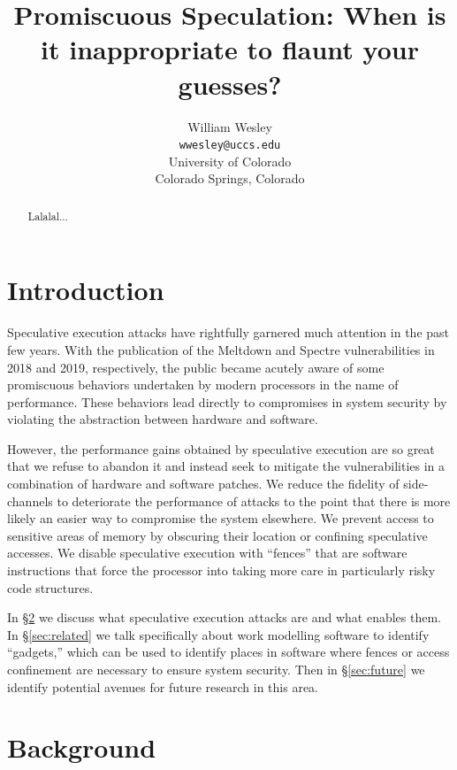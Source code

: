 \documentclass[11pt,conference]{IEEEtran}
\title{Promiscuous Speculation: When is it inappropriate to flaunt your guesses?}
\author{William Wesley \\
\texttt{wwesley@uccs.edu} \\
University of Colorado \\
Colorado Springs, Colorado}
\begin{document}
\maketitle

\begin{abstract}
Lalalal...
\end{abstract}

\section{Introduction}

Speculative execution attacks have rightfully garnered much attention in the past few years.
With the publication of the Meltdown\cite{meltdown} and Spectre\cite{spectre} vulnerabilities in 2018 and 2019, respectively, the public became acutely aware of some promiscuous behaviors undertaken by modern processors in the name of performance.
These behaviors lead directly to compromises in system security by violating the abstraction between hardware and software.

However, the performance gains obtained by speculative execution are so great that we refuse to abandon it and instead seek to mitigate the vulnerabilities in a combination of hardware and software patches.
We reduce the fidelity of side-channels to deteriorate the performance of attacks to the point that there is more likely an easier way to compromise the system elsewhere.
We prevent access to sensitive areas of memory by obscuring their location or confining speculative accesses.
We disable speculative execution with ``fences'' that are software instructions that force the processor into taking more care in particularly risky code structures.

In \S\ref{sec:background} we discuss what speculative execution attacks are and what enables them.
In \S\ref{sec:related} we talk specifically about work modelling software to identify ``gadgets,'' which can be used to identify places in software where fences or access confinement are necessary to ensure system security.
Then in \S\ref{sec:future} we identify potential avenues for future research in this area.

\section{Background}\label{sec:background}
\end{document}
